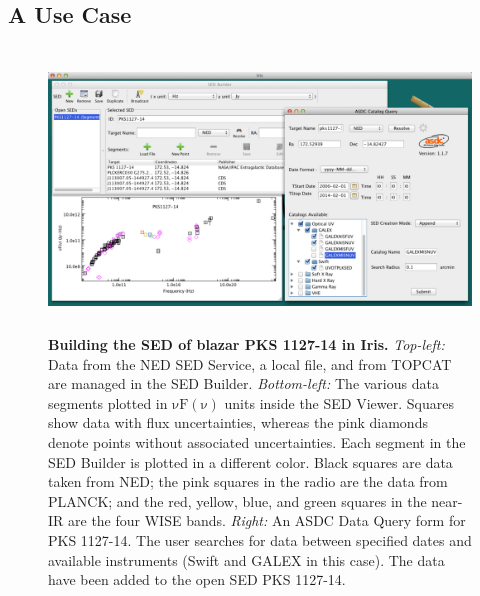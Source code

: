 \documentclass[preprint,authoryear,5p]{elsarticle}
\begin{document}
\subsection{A Use Case} \label{subsec:usecase}

\begin{figure} \centering
\includegraphics[height=2.95in,width=5.3in]{built-in-visuals-loading.pdf}
\caption{\textbf{Building the SED of blazar PKS 1127-14 in Iris.}  
\textit{Top-left:} Data from the NED SED Service, a local file, and from TOPCAT
are managed in the SED Builder. \textit{Bottom-left:} The various data segments
plotted in $\mathrm{\nu F \left( \nu \right)}$ units inside the SED Viewer.
Squares show data with flux uncertainties, whereas the pink diamonds denote
points without associated uncertainties. Each segment in the SED Builder is
plotted in a different color. Black squares are data taken from NED; the
pink squares in the radio are the data from PLANCK; and the red, yellow, blue,
and green squares in the near-IR are the four WISE bands. \textit{Right:} An ASDC
Data Query form for PKS 1127-14. The user searches for data between specified
dates and available instruments (Swift and GALEX in this case). The data have
been added to the open SED PKS 1127-14.} \label{fig:load_data}
\end{figure}
\end{document}
